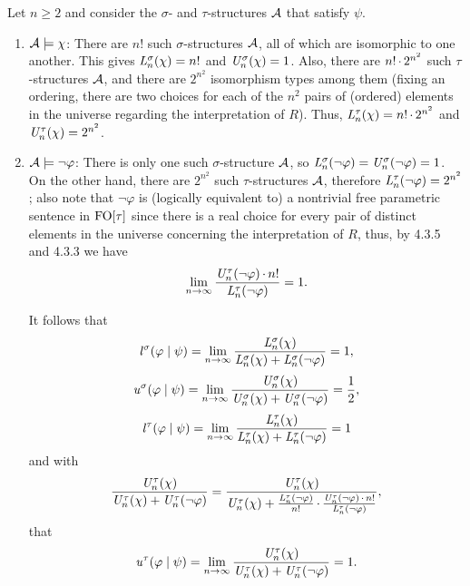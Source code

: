 \begin{enumerate}[1.]
Let $n \geq 2$ and consider the $\sigma$- and $\tau$-structures $\mathcal{A}$ that satisfy $\psi$.
\begin{enumerate}[(1)]
\item $\mathcal{A} \models \chi$: There are $n!$ such $\sigma$-structures $\mathcal{A}$, all of which are isomorphic to one another. This gives $\mathit{L}_{n}^\sigma(\chi) = n!$ and $\mathit{U}_{n}^\sigma(\chi) = 1$. Also, there are $n! \mathop{\cdot} 2^{n^2}$ such $\tau$-structures $\mathcal{A}$, and there are $2^{n^2}$ isomorphism types among them (fixing an ordering, there are two choices for each of the $n^2$ pairs of (ordered) elements in the universe regarding the interpretation of $R$). Thus, $\mathit{L}_{n}^\tau(\chi) = n! \mathop{\cdot} 2^{n^2}$ and $\mathit{U}_{n}^\tau(\chi) = 2^{n^2}$.
\item $\mathcal{A} \models \neg\varphi$: There is only one such $\sigma$-structure $\mathcal{A}$, so $\mathit{L}_{n}^\sigma(\neg\varphi) = \mathit{U}_{n}^\sigma(\neg\varphi) = 1$. On the other hand, there are $2^{n^2}$ such $\tau$-structures $\mathcal{A}$, therefore $\mathit{L}_{n}^\tau(\neg\varphi) = 2^{n^2}$; also note that $\neg\varphi$ is (logically equivalent to) a nontrivial free parametric sentence in $\folog\of{\tau}$ since there is a real choice for every pair of distinct elements in the universe concerning the interpretation of $R$, thus, by 4.3.5 and 4.3.3 we have
\[
\lim_{n \to \infty} \frac{\mathit{U}_{n}^\tau(\neg\varphi) \mathop{\cdot} n!}{\mathit{L}_{n}^\tau(\neg\varphi)} = 1.
\]

It follows that
\[
\lprob^\sigma(\varphi \wrt \psi) = \lim_{n \to \infty} \frac{\lclass{n}^\sigma(\chi)}{\lclass{n}^\sigma(\chi) + \lclass{n}^\sigma(\neg\varphi)} = 1,
\]
\[
\uprob^\sigma(\varphi \wrt \psi) = \lim_{n \to \infty} \frac{\uclass{n}^\sigma(\chi)}{\uclass{n}^\sigma(\chi) + \uclass{n}^\sigma(\neg\varphi)} = \frac{1}{2},
\]
\[
\lprob^\tau(\varphi \wrt \psi) = \lim_{n \to \infty} \frac{\lclass{n}^\tau(\chi)}{\lclass{n}^\tau(\chi) + \lclass{n}^\tau(\neg\varphi)} = 1
\]
and with
\[
\frac{\mathit{U}_{n}^\tau(\chi)}{\mathit{U}_{n}^\tau(\chi) + \mathit{U}_{n}^\tau(\neg\varphi)} = \frac{\mathit{U}_{n}^\tau(\chi)}{\mathit{U}_{n}^\tau(\chi) + \frac{\mathit{L}_{n}^\tau(\neg\varphi)}{n!} \mathop{\cdot} \frac{\mathit{U}_{n}^\tau(\neg\varphi) \mathop{\cdot} n!}{\mathit{L}_{n}^\tau(\neg\varphi)}},
\]
that
\[
\uprob^\tau(\varphi \wrt \psi) = \lim_{n \to \infty} \frac{\uclass{n}^\tau(\chi)}{\uclass{n}^\tau(\chi) + \uclass{n}^\tau(\neg\varphi)} = 1.
\]
\end{enumerate}
%
\end{enumerate}


